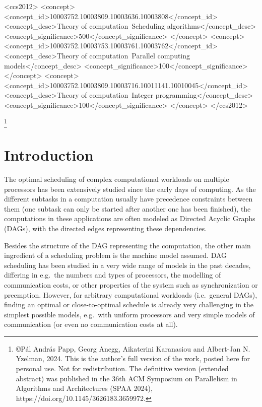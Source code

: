 \documentclass[sigconf,nonacm]{acmart}
\newcommand\blfootnote[1]{%
  \begingroup
  \renewcommand\thefootnote{}\footnote{#1}%
  \addtocounter{footnote}{-1}%
  \endgroup
}
\begin{document}
\begin{CCSXML}
<ccs2012>
<concept>
<concept_id>10003752.10003809.10003636.10003808</concept_id>
<concept_desc>Theory of computation~Scheduling algorithms</concept_desc>
<concept_significance>500</concept_significance>
</concept>
<concept>
<concept_id>10003752.10003753.10003761.10003762</concept_id>
<concept_desc>Theory of computation~Parallel computing models</concept_desc>
<concept_significance>100</concept_significance>
</concept>
<concept>
<concept_id>10003752.10003809.10003716.10011141.10010045</concept_id>
<concept_desc>Theory of computation~Integer programming</concept_desc>
<concept_significance>100</concept_significance>
</concept>
</ccs2012>
\end{CCSXML}



\maketitle

\blfootnote{\copyright P\'al Andr\'as Papp, Georg Anegg, Aikaterini Karanasiou and Albert-Jan N. Yzelman, 2024. This is the author's full version of the work, posted here for personal use. Not for redistribution. The definitive version (extended abstract) was published in the 36th ACM Symposium on Parallelism in Algorithms and Architectures (SPAA 2024), https://doi.org/10.1145/3626183.3659972.}

\section{Introduction}

The optimal scheduling of complex computational workloads on multiple processors has been extensively studied since the early days of computing. As the different subtasks in a computation usually have precedence constraints between them (one subtask can only be started after another one has been finished), the computations in these applications are often modeled as Directed Acyclic Graphs (DAGs), with the directed edges representing these dependencies.

Besides the structure of the DAG representing the computation, the other main ingredient of a scheduling problem is the machine model assumed. DAG scheduling has been studied in a very wide range of models in the past decades, differing in e.g.\ the numbers and types of processors, the modelling of communication costs, or other properties of the system such as synchronization or preemption. However, for arbitrary computational workloads (i.e.\ general DAGs), finding an optimal or close-to-optimal schedule is already very challenging in the simplest possible models, e.g.\ with uniform processors and very simple models of communication (or even no communication costs at all).
\end{document}
